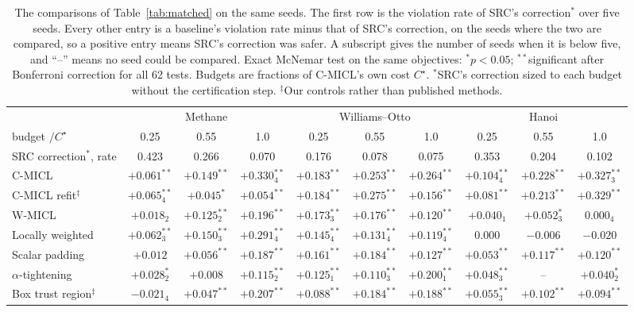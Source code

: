 \begin{table}[p]
\centering
\footnotesize
\setlength{\tabcolsep}{2.6pt}
\caption{The comparisons of Table~\ref{tab:matched} on the same seeds. The first row is
the violation rate of SRC's correction$^{\ast}$ over five seeds. Every other entry is a baseline's violation
rate minus that of SRC's correction, on the seeds where the two are compared, so a
positive entry means SRC's correction was safer. A subscript gives the number of
seeds when it is below five, and ``--'' means no seed could be compared. Exact
McNemar test on the same objectives: $^{\ast}p<0.05$; $^{\ast\ast}$significant
after Bonferroni correction for all 62 tests. Budgets are fractions of C-MICL's own
cost $C^{\star}$. $^{\ast}$SRC's correction sized to each budget without the
certification step. $^{\ddagger}$Our controls rather than published methods.}
\label{tab:matched-diff}
\begin{tabular}{l ccc ccc ccc}
\toprule
 & \multicolumn{3}{c}{Methane} & \multicolumn{3}{c}{Williams--Otto} & \multicolumn{3}{c}{Hanoi} \\
\cmidrule(lr){2-4}\cmidrule(lr){5-7}\cmidrule(lr){8-10}
budget $/C^{\star}$ & 0.25 & 0.55 & 1.0 & 0.25 & 0.55 & 1.0 & 0.25 & 0.55 & 1.0 \\
\midrule
SRC correction$^{\ast}$, rate & 0.423 & 0.266 & 0.070 & 0.176 & 0.078 & 0.075 & 0.353 & 0.204 & 0.102 \\
\midrule
C-MICL~\cite{bib12} & $+0.061^{\ast\ast}$ & $+0.149^{\ast\ast}$ & $+0.330^{\ast\ast}_{4}$ & $+0.183^{\ast\ast}$ & $+0.253^{\ast\ast}$ & $+0.264^{\ast\ast}$ & $+0.104^{\ast\ast}_{4}$ & $+0.228^{\ast\ast}$ & $+0.327^{\ast\ast}_{3}$ \\
C-MICL refit$^{\ddagger}$ & $+0.065^{\ast\ast}_{4}$ & $+0.045^{\ast}$ & $+0.054^{\ast\ast}$ & $+0.184^{\ast\ast}$ & $+0.275^{\ast\ast}$ & $+0.156^{\ast\ast}$ & $+0.081^{\ast\ast}$ & $+0.213^{\ast\ast}$ & $+0.329^{\ast\ast}$ \\
W-MICL~\cite{bib12} & $+0.018_{2}$ & $+0.125^{\ast\ast}_{2}$ & $+0.196^{\ast\ast}$ & $+0.173^{\ast\ast}_{3}$ & $+0.176^{\ast\ast}$ & $+0.120^{\ast\ast}$ & $+0.040_{1}$ & $+0.052^{\ast}_{3}$ & $0.000_{4}$ \\
Locally weighted~\cite{bib31} & $+0.062^{\ast\ast}_{3}$ & $+0.150^{\ast\ast}_{3}$ & $+0.291^{\ast\ast}_{4}$ & $+0.145^{\ast\ast}_{4}$ & $+0.131^{\ast\ast}_{4}$ & $+0.119^{\ast\ast}_{4}$ & $0.000$ & $-0.006$ & $-0.020$ \\
Scalar padding & $+0.012$ & $+0.056^{\ast\ast}$ & $+0.187^{\ast\ast}$ & $+0.161^{\ast\ast}$ & $+0.184^{\ast\ast}$ & $+0.127^{\ast\ast}$ & $+0.053^{\ast\ast}$ & $+0.117^{\ast\ast}$ & $+0.120^{\ast\ast}$ \\
$\alpha$-tightening & $+0.028^{\ast}_{2}$ & $+0.008$ & $+0.115^{\ast\ast}_{2}$ & $+0.125^{\ast\ast}_{1}$ & $+0.110^{\ast\ast}_{3}$ & $+0.200^{\ast\ast}_{1}$ & $+0.048^{\ast\ast}_{3}$ & -- & $+0.040^{\ast}_{2}$ \\
Box trust region$^{\ddagger}$ & $-0.021_{4}$ & $+0.047^{\ast\ast}$ & $+0.207^{\ast\ast}$ & $+0.088^{\ast\ast}$ & $+0.184^{\ast\ast}$ & $+0.188^{\ast\ast}$ & $+0.055^{\ast\ast}_{3}$ & $+0.102^{\ast\ast}$ & $+0.094^{\ast\ast}$ \\
\bottomrule
\end{tabular}
\end{table}
